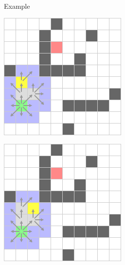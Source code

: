 \documentclass{presentation}
\begin{document}
\begin{frame}{Example}
\begin{minipage}{0.2\textwidth}
	\end{minipage}%
	\hfill%
	\begin{minipage}{0.2\textwidth}
		\includegraphics[width=\textwidth]{figures/A-Stern_geschnitten(241x241)/5.png}
	\end{minipage}%
	\hspace{3cm}
	\begin{minipage}{0.2\textwidth}
		\includegraphics[width=\textwidth]{figures/A-Stern_geschnitten(241x241)/6.png}

\end{minipage}
\end{frame}
\end{document}
